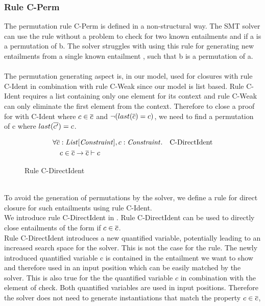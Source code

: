 \subsubsection{Rule C-Perm}
The permutation rule C-Perm is defined in a
non-structural way.
The SMT solver can use the rule without a problem to check for
two known entailments  and 
if \ovl a is a permutation of \ovl b.
The solver struggles with using this rule
for generating new entailments 
from a single known entailment ,
such that \ovl b is a permutation of \ovl a.\\
\\
The permutation generating aspect is, in our model,
used for closures with rule C-Ident in combination with rule C-Weak
since our model is list based.
Rule C-Ident requires a list containing only one
element for its context and rule C-Weak can only
eliminate the first element from the context.
Therefore to close a proof for  with C-Ident
where $c \in \overline{c}$ and $\neg (last(\overline{c}) = c)$,
we need to find a permutation  of \ovl c
where $last(\overline{c'}) = c$.
%
\begin{figure}[h]
\begin{align*}
&\forall \overline{c}: \mathit{List[\mathit{Constraint}]}, c: \mathit{Constraint}. && \text{C-DirectIdent}\\
&\quad c \in \overline{c} \rightarrow \overline{c} \vdash c
\end{align*}
\caption{Rule C-DirectIdent}
\label{fig:axioms-cdirectident}
\end{figure}\\
%
To avoid the generation of permutations by the solver,
we define a rule for direct closure for such entailments
using rule C-Ident.\\
We introduce rule C-DirectIdent in .
Rule C-DirectIdent can be used to directly close entailments
of the form  if $c \in \overline{c}$.\\
Rule C-DirectIdent introduces a new quantified variable,
potentially leading to an increased search space for the solver.
This is not the case for the rule.
The newly introduced quantified variable \ovl c
is contained in the entailment we want to show
and therefore used in an input position
which can be easily matched by the solver.
This is also true for the the quantified variable $c$
in combination with the element of check.
Both quantified variables are used in input positions.
Therefore the solver does not need to generate
instantiations that match the property $c \in \overline{c}$,
